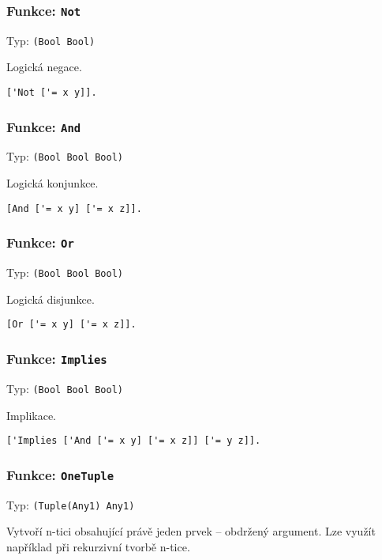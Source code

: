 \subsubsection*{Funkce: \lstinline{Not}}
Typ: \lstinline{(Bool Bool)}

Logická negace.

\begin{lstlisting}[caption={Ukázka využití Not}]
['Not ['= x y]].
\end{lstlisting}

\subsubsection*{Funkce: \lstinline{And}}
Typ: \lstinline{(Bool Bool Bool)}

Logická konjunkce.

\begin{lstlisting}[caption={Ukázka využití And}]
[And ['= x y] ['= x z]].
\end{lstlisting}

\subsubsection*{Funkce: \lstinline{Or}}
Typ: \lstinline{(Bool Bool Bool)}

Logická disjunkce.

\begin{lstlisting}[caption={Ukázka využití Or}]
[Or ['= x y] ['= x z]].
\end{lstlisting}

\subsubsection*{Funkce: \lstinline{Implies}}
Typ: \lstinline{(Bool Bool Bool)}

Implikace.

\begin{lstlisting}[caption={Ukázka využití Implies}]
['Implies ['And ['= x y] ['= x z]] ['= y z]].
\end{lstlisting}

\subsubsection*{Funkce: \lstinline{OneTuple}}
Typ: \lstinline{(Tuple(Any1) Any1)}

Vytvoří n-tici obsahující právě jeden prvek -- obdržený argument. Lze využít například při rekurzivní
tvorbě n-tice.

